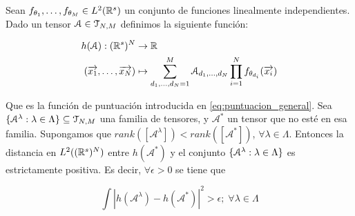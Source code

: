 \begin{lema} \label{lema:lema_previo_corolario}
    Sean $f_{\theta_1}, \ldots, f_{\theta_M} \in L^2(\mathbb{R}^s)$ un conjunto de funciones linealmente independientes. Dado un tensor $\mathcal{A} \in \mathcal{T}_{N, M}$ definimos la siguiente función:

    \begin{equation}
    \begin{split}
        h(\mathcal{A}): (\mathbb{R}^s)^N &\to \mathbb{R} \\
        (\overrightarrow{x_1}, \ldots, \overrightarrow{x_N}) &\mapsto \sum_{d_1, \ldots, d_N = 1}^M \mathcal{A}_{d_1, \ldots, d_N} \prod_{i = 1}^N f_{\theta_{d_i}}(\overrightarrow{x_i})
    \end{split}
    \end{equation}

    Que es la función de puntuación introducida en \eqref{eq:puntuacion_general}. Sea $\{ \mathcal{A}^\lambda: \lambda \in \Lambda \} \subseteq \mathcal{T}_{N, M}$ una familia de tensores, y $\mathcal{A}^*$ un tensor que no esté en esa familia. Supongamos que $rank([\mathcal{A}^\lambda]) < rank([\mathcal{A}^*])$, $\forall \lambda \in \Lambda$. Entonces la distancia en $L^2((\mathbb{R}^s)^N)$ entre $h(\mathcal{A}^*)$ y el conjunto $\{ \mathcal{A}^\lambda: \lambda \in \Lambda \}$ es estrictamente positiva. Es decir, $\forall \epsilon > 0$ se tiene que

    \begin{equation}
        \int |h(\mathcal{A}^\lambda) - h(\mathcal{A}^*)|^2 > \epsilon; \; \forall \lambda \in \Lambda
    \end{equation}
\end{lema}

